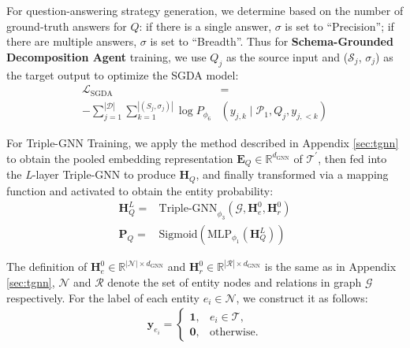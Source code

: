 \documentclass[11pt]{article}
\begin{document}
For question-answering strategy generation, we determine based on the number of ground‑truth answers for $Q$: if there is a single answer, $\sigma$ is set to ``Precision''; if there are multiple answers, $\sigma$ is set to ``Breadth''. Thus for \textbf{Schema-Grounded Decomposition Agent} training, we use $Q_j$ as the source
input and ($\mathcal{S}_j$, $\sigma_j$) as the target output to optimize the SGDA model:
\begin{align}
    \mathcal{L}_{\text{SGDA}}&=  \nonumber\\ - \sum_{j=1}^{|\mathcal{D}|} \sum_{k=1}^{|(\textit{S}_j, \sigma_j)|} \log P_{\phi_6}&(y_{j,k} \mid \mathcal{P}_1, Q_j, y_{j,<k})
\end{align}

For Triple-GNN Training, we apply the method described in Appendix \ref{sec:tgnn} to obtain the pooled embedding representation $\mathbf{E}_Q \in \mathbb{R}^{d_\text{GNN}}$ of $\mathcal{T}^{'}$, then fed into the \textit{L}-layer Triple-GNN to produce $\mathbf{H}_Q$, and finally transformed via a mapping function and activated to obtain the entity probability:
\begin{align}
\mathbf{H}_Q^L = & \text{Triple-GNN}_{\phi_3}(\mathcal{G}, \mathbf{H}_e^0, \mathbf{H}_r^0) \\
\boldsymbol{P}_Q = & \mathrm{Sigmoid}(\text{MLP}_{\phi_1}(\mathbf{H}_Q^L))
\end{align}

The definition of $\mathbf{H}_e^0 \in \mathbb{R}^{|\mathcal{N}|\times{d_\text{GNN}}}$ and $\mathbf{H}_r^0 \in \mathbb{R}^{|\mathcal{R}|\times{d_\text{GNN}}}$ is the same as in Appendix \ref{sec:tgnn}, $\mathcal{N}$ and $\mathcal{R}$ denote the set of entity nodes and relations in graph $\mathcal{G}$ respectively. For the label of each entity $e_i \in \mathcal{N}$, we construct it as follows:
\begin{align}
\boldsymbol{y}_{e_i} = \begin{cases} 
\boldsymbol{1}, & e_i \in \mathcal{T}, \\
\boldsymbol{0}, & \text{otherwise}.
\end{cases}
\end{align}
\end{document}
